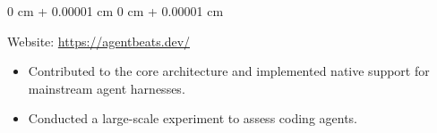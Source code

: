 \documentclass[10pt, letterpaper]{article}
\newenvironment{highlights}{
    \begin{itemize}[
        topsep=0.10 cm,
        parsep=0.10 cm,
        partopsep=0pt,
        itemsep=0pt,
        leftmargin=0 cm + 10pt
    ]
}{
    \end{itemize}
} %
\newenvironment{onecolentry}{
    \begin{adjustwidth}{
        0 cm + 0.00001 cm
    }{
        0 cm + 0.00001 cm
    }
}{
    \end{adjustwidth}
} %
\begin{document}
        \vspace{0.10 cm}
        \begin{onecolentry}
            Website: \url{https://agentbeats.dev/}
            \begin{highlights}
                \item Contributed to the core architecture and implemented native support for mainstream agent harnesses.
                \item Conducted a large-scale experiment to assess coding agents.  
            \end{highlights}
        \end{onecolentry}

        
\end{document}
